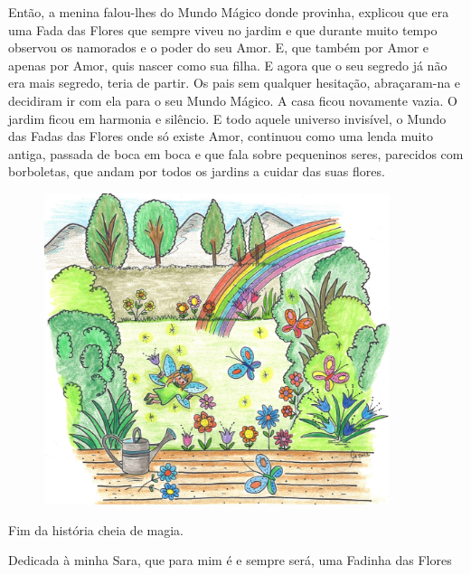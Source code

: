 \documentclass[12pt, a4paper, twoside]{memoir}
\begin{document}
Então, a menina falou-lhes do Mundo Mágico donde provinha, explicou que era uma Fada das Flores que sempre viveu no jardim e que durante muito tempo observou os namorados e o poder do seu Amor.
E, que também por Amor e apenas por Amor, quis nascer como sua filha.
\bigbreak
E agora que o seu segredo já não era mais segredo, teria de partir.
Os pais sem qualquer hesitação, abraçaram-na e decidiram ir com ela para o seu Mundo Mágico.
\bigbreak
A casa ficou novamente vazia. O jardim ficou em harmonia e silêncio.
\bigbreak
E todo aquele universo invisível, o Mundo das Fadas das Flores onde só existe Amor, continuou como uma lenda muito antiga, passada de boca em boca e que fala sobre pequeninos seres, parecidos com borboletas, que andam por todos os jardins a cuidar das suas flores.


\begin{figure}[h]
    \centering
    \includegraphics[width=0.9\textwidth]{no_jardim_com_arco_iris}
\end{figure}

\newpage
\begin{vplace}
    Fim da história cheia de magia.
    \\[16pt]
    \bigbreak
    \begin{flushright}
        Dedicada à minha Sara, que para mim é e sempre será,\linebreak
        uma Fadinha das Flores
    \end{flushright}
\end{vplace}
\end{document}
